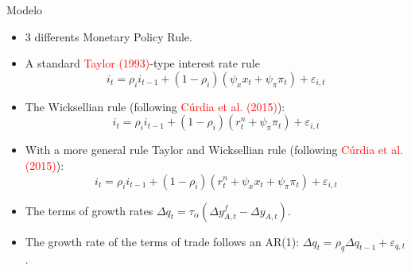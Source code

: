 \documentclass[9pt]{beamer}
\let\olditem\item
\renewcommand{\item}{%
\olditem\vspace{\fill}}
\begin{document}
\begin{frame}{Modelo}
\begin{itemize}
\item 3 differents Monetary Policy Rule.

\item A standard \textcolor{red}{Taylor (1993)}-type interest rate rule
\begin{equation*}
    i_t = \rho_i i_{t-1} + (1 - \rho_i)(\psi_{x}x_t + \psi_{\pi} \pi_t) + \varepsilon_{i,t}
\end{equation*}

\item The Wicksellian rule  (following \textcolor{red}{Cúrdia et al. (2015)}):
\begin{equation*}
    i_t = \rho_i i_{t-1} + (1 - \rho_i)(r_t^{n} + \psi_{\pi} \pi_t) + \varepsilon_{i,t}
\end{equation*}

\item With a more general rule Taylor and Wicksellian rule  (following \textcolor{red}{Cúrdia et al. (2015)}):
\begin{equation*}
    i_t = \rho_i i_{t-1} + (1 - \rho_i)(r_t^{n} + \psi_{x}x_t + \psi_{\pi} \pi_t) + \varepsilon_{i,t}
\end{equation*}

\item The terms of growth rates $\Delta q_t = \tau_{\alpha}(\Delta y_{A,t}^{f} - \Delta y_{A,t})$.

\item The growth rate of the terms of trade follows an AR(1): $\Delta q_t = \rho_q \Delta q_{t-1} + \varepsilon_{q,t}$.


\end{itemize}
\end{frame}
\end{document}
